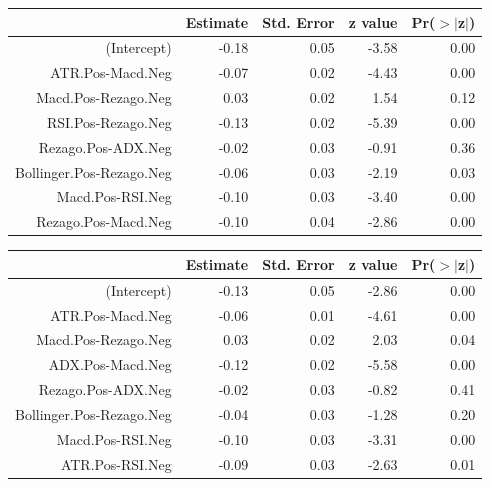 \documentclass[a4paper,12pt]{Latex/Classes/PhDthesisPSnPDF}
\begin{document}
\begin{center}
\begin{table}[ht]
\centering
\begin{tabular}{rrrrr}
  \hline
 & Estimate & Std. Error & z value & Pr($>$$|$z$|$) \\ 
  \hline
(Intercept) & -0.18 & 0.05 & -3.58 & 0.00 \\ 
  ATR.Pos-Macd.Neg & -0.07 & 0.02 & -4.43 & 0.00 \\ 
  Macd.Pos-Rezago.Neg & 0.03 & 0.02 & 1.54 & 0.12 \\ 
  RSI.Pos-Rezago.Neg & -0.13 & 0.02 & -5.39 & 0.00 \\ 
  Rezago.Pos-ADX.Neg & -0.02 & 0.03 & -0.91 & 0.36 \\ 
  Bollinger.Pos-Rezago.Neg & -0.06 & 0.03 & -2.19 & 0.03 \\ 
  Macd.Pos-RSI.Neg & -0.10 & 0.03 & -3.40 & 0.00 \\ 
  Rezago.Pos-Macd.Neg & -0.10 & 0.04 & -2.86 & 0.00 \\ 
   \hline
\end{tabular}
\end{table}\end{center}

\begin{center}
\begin{table}[ht]
\centering
\begin{tabular}{rrrrr}
  \hline
 & Estimate & Std. Error & z value & Pr($>$$|$z$|$) \\ 
  \hline
(Intercept) & -0.13 & 0.05 & -2.86 & 0.00 \\ 
  ATR.Pos-Macd.Neg & -0.06 & 0.01 & -4.61 & 0.00 \\ 
  Macd.Pos-Rezago.Neg & 0.03 & 0.02 & 2.03 & 0.04 \\ 
  ADX.Pos-Macd.Neg & -0.12 & 0.02 & -5.58 & 0.00 \\ 
  Rezago.Pos-ADX.Neg & -0.02 & 0.03 & -0.82 & 0.41 \\ 
  Bollinger.Pos-Rezago.Neg & -0.04 & 0.03 & -1.28 & 0.20 \\ 
  Macd.Pos-RSI.Neg & -0.10 & 0.03 & -3.31 & 0.00 \\ 
  ATR.Pos-RSI.Neg & -0.09 & 0.03 & -2.63 & 0.01 \\ 
   \hline
\end{tabular}
\end{table}\end{center}
\end{document}
